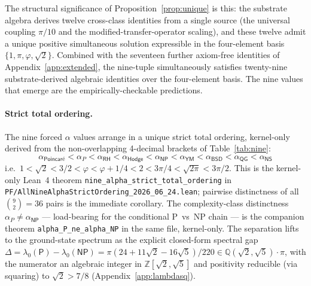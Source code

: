 \documentclass[11pt,a4paper]{amsart}
\theoremstyle{plain}
\theoremstyle{definition}
\begin{document}
The structural significance of Proposition~\ref{prop:unique} is this: the substrate algebra derives twelve cross-class identities from a single source (the universal coupling $\pi/10$ and the modified-transfer-operator scaling), and these twelve admit a unique positive simultaneous solution expressible in the four-element basis $\{1, \pi, \varphi, \sqrt{2}\}$. Combined with the seventeen further axiom-free identities of Appendix~\ref{app:extended}, the nine-tuple simultaneously satisfies twenty-nine substrate-derived algebraic identities over the four-element basis. The nine values that emerge are the empirically-checkable predictions.

\paragraph{Strict total ordering.} The nine forced $\alpha$ values arrange in a unique strict total ordering, kernel-only derived from the non-overlapping 4-decimal brackets of Table~\ref{tab:nine}:
\[
\alpha_{\textsf{Poincar\'e}} < \alpha_P < \alpha_{\textsf{RH}} < \alpha_{\textsf{Hodge}} < \alpha_{\textsf{NP}} < \alpha_{\textsf{YM}} < \alpha_{\textsf{BSD}} < \alpha_{\textsf{QG}} < \alpha_{\textsf{NS}}
\]
i.e.\ $1 < \sqrt{2} < 3/2 < \varphi < \varphi + 1/4 < 2 < 3\pi/4 < \sqrt{2\pi} < 3\pi/2$. This is the kernel-only Lean~4 theorem \texttt{nine\_alpha\_strict\_total\_ordering} in \texttt{PF/AllNineAlphaStrictOrdering\_2026\_06\_24.lean}; pairwise distinctness of all $\binom{9}{2} = 36$ pairs is the immediate corollary. The complexity-class distinctness $\alpha_P \neq \alpha_{\textsf{NP}}$ --- load-bearing for the conditional P~vs~NP chain --- is the companion theorem \texttt{alpha\_P\_ne\_alpha\_NP} in the same file, kernel-only. The separation lifts to the ground-state spectrum as the explicit closed-form spectral gap $\Delta = \lambda_0(\textsf{P}) - \lambda_0(\textsf{NP}) = \pi(24 + 11\sqrt{2} - 16\sqrt{5})/220 \in \mathbb{Q}(\sqrt{2}, \sqrt{5})\cdot\pi$, with the numerator an algebraic integer in $\mathbb{Z}[\sqrt{2}, \sqrt{5}]$ and positivity reducible (via squaring) to $\sqrt{2} > 7/8$ (Appendix~\ref{app:lambdasq}).
\end{document}
